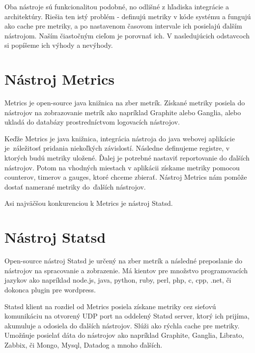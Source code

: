 \documentclass[a4paper, upjsfrontpage, thesismargins, thesislinespacing]{rnthesis}
\begin{document}
Oba nástroje sú funkcionalitou podobné, no odlišné z hľadiska integrácie a architektúry.
Riešia ten istý problém - definujú metriky v kóde systému a fungujú ako cache pre metriky, a po nastavenom časovom intervale ich posielajú ďalším nástrojom.
Naším čiastočným cieľom je porovnať ich.
V nasledujúcich odstavcoch si popíšeme ich výhody a nevýhody.

\section{Nástroj Metrics}

Metrics je open-source java knižnica na zber metrík.
Získané metriky posiela do nástrojov na zobrazovanie metrík ako napríklad Graphite alebo Ganglia, alebo ukladá do databázy prostredníctvom logovacích nástrojov.

Keďže Metrics je java knižnica, integrácia nástroja do java webovej aplikácie je~záležitosť pridania niekoľkých závislostí.
Následne definujeme registre, v ktorých budú metriky uložené.
Ďalej je potrebné nastaviť reportovanie do ďalších nástrojov.
Potom na vhodných miestach v aplikácii získame metriky pomocou counterov, timerov a gauges, ktoré chceme zbierať.
Nástroj Metrics nám pomôže dostať namerané metriky do~ďalších nástrojov.

Asi najväčšou konkurenciou k Metrics je nástroj Statsd.


\section{Nástroj Statsd}

Open-source nástroj Statsd je určený na zber metrík a následné preposlanie do nástrojov na spracovanie a zobrazenie.
Má kientov pre množstvo programovacích jazykov ako napríklad node.js, java, python, ruby, perl, php, c, cpp, .net, či dokonca plugin pre wordpress. 

Statsd klient na rozdiel od Metrics posiela získane metriky cez sieťovú komunikáciu na otvorený UDP port na oddelený Statsd server, ktorý ich prijíma, akumuluje a odosiela do ďalších nástrojov. 
Slúži ako rýchla cache pre metriky. 
Umožňuje posielať dáta do nástrojov ako napríklad Graphite, Ganglia, Librato, Zabbix, či Mongo, Mysql, Datadog a mnoho ďalších.
\end{document}
